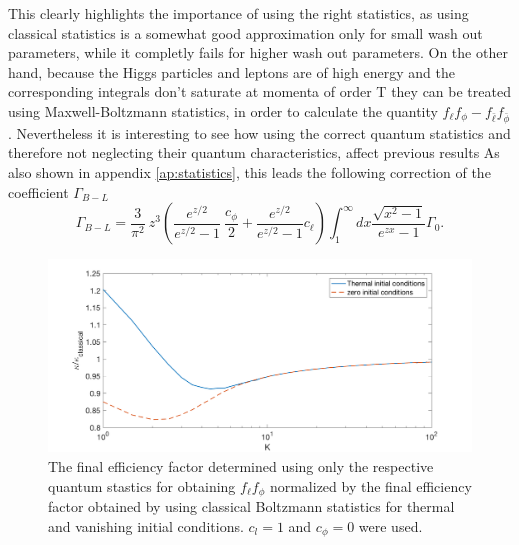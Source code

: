 This clearly highlights the importance of using the right statistics, as using classical statistics is a somewhat good approximation only for small wash out parameters, while it completly fails for higher wash out parameters.\newline \indent
On the other hand, because the Higgs particles and leptons are of high energy and the corresponding integrals don't saturate at momenta of order T they can be treated using Maxwell-Boltzmann statistics, in order to calculate the quantity $f_\ell f_\phi-f_{\bar{\ell}}f_{\bar{\phi}}$. Nevertheless it is interesting to see how using the correct quantum statistics and therefore not neglecting their quantum characteristics, affect previous results
As also shown in appendix \ref{ap:statistics}, this leads the following correction of the coefficient $\Gamma_{B-L}$
\begin{equation}
\Gamma_{B-L}=\frac{3}{\pi^2}\:z^3\left(\frac{e^{z/2}}{e^{z/2}-1}\:\frac{c_\phi}{2}+\frac{e^{z/2}}{e^{z/2}-1}c_\ell\right)\int_{1}^{\infty}dx\frac{\sqrt{x^2-1}}{e^{zx}-1}\Gamma_0.
\label{eq:B-L_corrected}
\end{equation}
\begin{figure}[H]
	\centering
	\includegraphics[width=0.8\linewidth]{Images/quantum1}
	\caption{The final efficiency factor determined using only the respective quantum stastics for obtaining $f_\ell f_\phi$ normalized by the final efficiency factor obtained by using classical Boltzmann statistics for thermal and vanishing initial conditions. $c_l=1$ and $c_\phi=0$ were used.}
	\label{fig:quantum1}
\end{figure} \noindent
